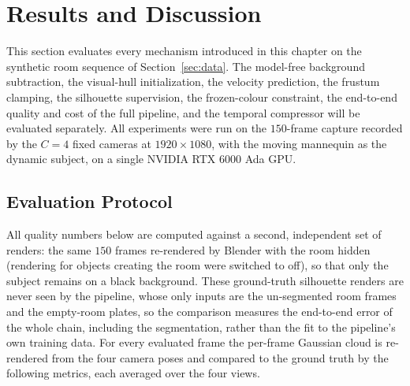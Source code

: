 \section{Results and Discussion}
\label{sec:results}

This section evaluates every mechanism introduced in this chapter on the synthetic
room sequence of Section~\ref{sec:data}. The model-free background subtraction, the
visual-hull initialization, the velocity prediction, the frustum clamping, the
silhouette supervision, the frozen-colour constraint, the end-to-end quality and cost
of the full pipeline, and the temporal compressor will be evaluated separately. All experiments were run on the
$150$-frame capture recorded by the $C = 4$ fixed cameras at $1920 \times 1080$, with
the moving mannequin as the dynamic subject, on a single NVIDIA RTX 6000 Ada GPU.

\subsection{Evaluation Protocol}
\label{sec:results-protocol}

All quality numbers below are computed against a second, independent set of renders:
the same $150$ frames re-rendered by Blender with the room hidden (rendering for objects creating the room were switched to off), so that only
the subject remains on a black background. These ground-truth silhouette renders are
never seen by the pipeline, whose only inputs are the un-segmented room frames and the
empty-room plates, so the comparison measures the end-to-end error of the whole
chain, including the segmentation, rather than the fit to the pipeline's own training
data. For every evaluated frame the per-frame Gaussian cloud is re-rendered from the
four camera poses and compared to the ground truth by the following metrics, each
averaged over the four views.

